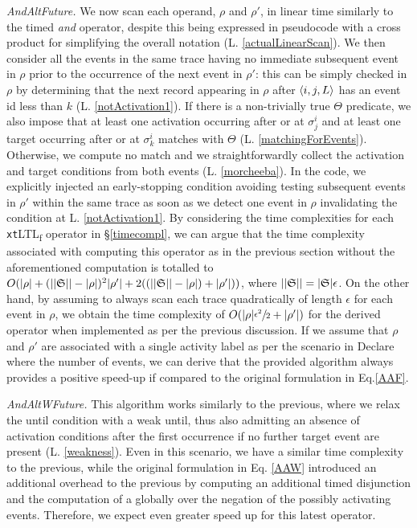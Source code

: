 \documentclass[sigconf]{acmart}
\begin{document}
\textit{AndAltFuture.} We now scan each operand, $\rho$ and $\rho'$, in linear time similarly to the timed \textit{and} operator, despite this being expressed in pseudocode with a cross product for simplifying the overall notation (L. \ref{actualLinearScan}). We then consider all the events in the same trace having no immediate subsequent event in $\rho$ prior to the occurrence of the next event in $\rho'$: this can be simply checked in $\rho$ by determining that the next record appearing in $\rho$ after $\braket{i,j,L}$ has an event id less than $k$ (L. \ref{notActivation1}). If there is a non-trivially true $\Theta$ predicate, we also impose that at least one activation occurring after or at $\sigma^i_j$ and at least one target occurring after or at $\sigma^i_k$ matches with $\Theta$ (L. \ref{matchingForEvents}). Otherwise, we compute no match and we straightforwardly collect the activation and target conditions from both events (L. \ref{morcheeba}). In the code, we explicitly injected an early-stopping condition avoiding testing subsequent events in $\rho'$ within the same trace as soon as we detect one event in $\rho$ invalidating the condition at L. \ref{notActivation1}. By considering the time complexities for each \texttt{xt}LTL\textsubscript{f} operator in \S\ref{timecompl}, we can argue that the time complexity associated with computing this operator as in the previous section without the aforementioned computation is totalled to $O(|\rho|+(||\mathfrak{S}||-|\rho|)^2|\rho'|+2((||\mathfrak{S}||-|\rho|)+|\rho'|))$, where $||\mathfrak{S}||=|\mathfrak{S}|\epsilon$. On the other hand, by assuming to always scan each trace quadratically of length $\epsilon$ for each event in $\rho$, we obtain the time complexity of $O(|\rho|\sfrac{\epsilon^2}{2}+|\rho'|)$ for the derived operator when implemented as per the previous discussion. If we assume that $\rho$ and $\rho'$ are associated with a single activity label as per the scenario in Declare where the number of events, we can derive that the provided algorithm always provides a positive speed-up if compared to the original formulation in Eq.\ref{AAF}. \medskip

\textit{AndAltWFuture.} This algorithm works similarly to the previous, where we relax the until condition with a weak until, thus also admitting an absence of activation conditions after the first occurrence if no further target event are present (L. \ref{weakness}). Even in this scenario, we have a similar time complexity to the previous, while the original formulation in Eq. \ref{AAW} introduced an additional overhead to the previous by computing an additional timed disjunction and the computation of a globally over the negation of the possibly activating events. Therefore, we expect even greater speed up for this latest operator.   \medskip
\end{document}
